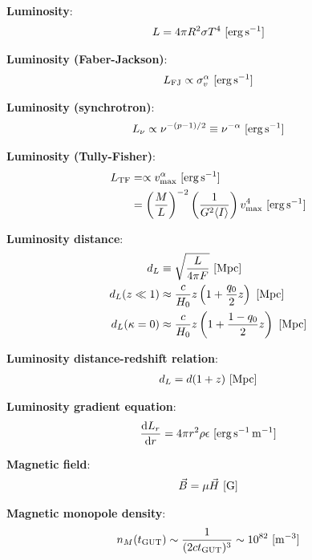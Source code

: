 \documentclass[a4paper,10pt]{article}
\begin{document}
{\noindent}\textbf{Luminosity}:
\begin{align*}
    L=4\pi R^2\sigma T^4 ~ [{\rm erg\,s^{-1}}]
\end{align*}

{\noindent}\textbf{Luminosity (Faber-Jackson)}:
\begin{align*}
    L_\mathrm{FJ} \propto \sigma_v^\alpha ~ [{\rm erg\,s^{-1}}]
\end{align*}

{\noindent}\textbf{Luminosity (synchrotron)}:
\begin{align*}
    L_\nu \propto \nu^{-(p-1)/2}\equiv \nu^{-\alpha} ~ [{\rm erg\,s^{-1}}]
\end{align*}

{\noindent}\textbf{Luminosity (Tully-Fisher)}:
\begin{align*}
    L_\mathrm{TF} &= \propto v_\mathrm{max}^\alpha ~ [{\rm erg\,s^{-1}}] \\
    &= \left(\frac{M}{L}\right)^{-2} \left(\frac{1}{G^2\langle I\rangle}\right)v_\mathrm{max}^4 ~ [{\rm erg\,s^{-1}}]
\end{align*}

{\noindent}\textbf{Luminosity distance}:
\begin{align*}
    d_L &\equiv \sqrt{\frac{L}{4\pi F}} ~ [{\rm Mpc}] \\
    d_L(z\ll1) &\approx \frac{c}{H_0}z\left(1+\frac{q_0}{2}z\right) ~ [{\rm Mpc}] \\
    d_L(\kappa=0) &\approx \frac{c}{H_0}z \left(1+\frac{1-q_0}{2}z\right) ~ [{\rm Mpc}]
\end{align*}

{\noindent}\textbf{Luminosity distance-redshift relation}:
\begin{align*}
    d_L = d(1+z) ~ [{\rm Mpc}]
\end{align*}

{\noindent}\textbf{Luminosity gradient equation}:
\begin{align*}
    \frac{{\rm d}L_r}{{\rm d}r} = 4\pi r^2\rho\epsilon ~ [{\rm erg\,s^{-1}\,m^{-1}}]
\end{align*}

{\noindent}\textbf{Magnetic field}:
\begin{align*}
    \vec{B} = \mu\vec{H} ~ [{\rm G}]
\end{align*}

{\noindent}\textbf{Magnetic monopole density}:
\begin{align*}
    n_M(t_\mathrm{GUT}) \sim \frac{1}{(2ct_\mathrm{GUT})^3} \sim 10^{82} ~ [{\rm m^{-3}}]
\end{align*}
\end{document}
